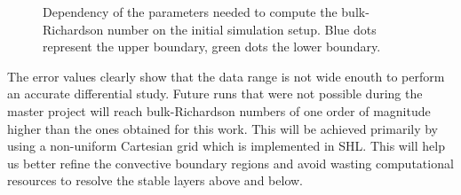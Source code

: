 \begin{figure}[t!]
  \centering
      \hfill
	\hfill
	\caption{Dependency of the parameters needed to compute the bulk-Richardson number on the initial simulation setup. Blue dots represent the upper boundary, green dots the lower boundary.}
	\label{fig:diffparam}
\end{figure}

The error values clearly show that the data range is not wide enouth to perform an accurate differential study. Future runs that were not possible during the master project will reach bulk-Richardson numbers of one order of magnitude higher than the ones obtained for this work. This will be achieved primarily by using a non-uniform Cartesian grid which is implemented in SHL. This will help us better refine the convective boundary regions and avoid wasting computational resources to resolve the stable layers above and below.

